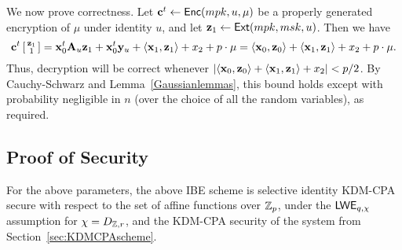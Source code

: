 We now prove correctness. Let $\mathbf{c}^t \gets \mathsf{Enc}(mpk, u, \mu)$ be
a properly generated encryption of $\mu$ under identity $u$, and let
$\mathbf{z}_{1} \gets \mathsf{Ext}(mpk, msk, u)$.  Then we have
\[ \mathbf{c}^t \left[
  \begin{smallmatrix}
    \mathbf{z}_{1} \\ 1
  \end{smallmatrix} \right] = \mathbf{x}_0^t \mathbf{A}_{u} \mathbf{z}_{1} + \mathbf{x}_0^t
\mathbf{y}_{u} + \langle{\ensuremath{\mathbf{x}}_1, \ensuremath{\mathbf{z}}_{1}}\rangle + x_2 + p\cdot\mu = \langle{\ensuremath{\mathbf{x}}_0,
  \ensuremath{\mathbf{z}}_{0}}\rangle + \langle{\ensuremath{\mathbf{x}}_1, \ensuremath{\mathbf{z}}_{1}}\rangle + x_2 + p\cdot\mu.\] Thus,
decryption will be correct whenever $\lvert{\langle{\ensuremath{\mathbf{x}}_0,
    \ensuremath{\mathbf{z}}_{0}}\rangle+\langle{\ensuremath{\mathbf{x}}_1, \ensuremath{\mathbf{z}}_{1}}\rangle+x_2}\rvert < p/2$.  By
Cauchy-Schwarz and Lemma~\ref{Gaussianlemmas}, this bound holds except
with probability negligible in $n$ (over the choice of all the random
variables), as required.

\subsection{Proof of Security}
\label{subsec:securityproof}

\begin{theorem}
  \label{thm:kdm-cpa-ibe}
  For the above parameters, the above IBE scheme is selective identity
  KDM-CPA secure with respect to the set of affine functions over
  $\mathbb{Z}_p$, under the $\mathsf{LWE}_{q,\chi}$ assumption for $\chi=D_{\mathbb{Z},r}$, and
  the KDM-CPA security of the system from
  Section~\ref{sec:KDMCPAscheme}.
\end{theorem}


